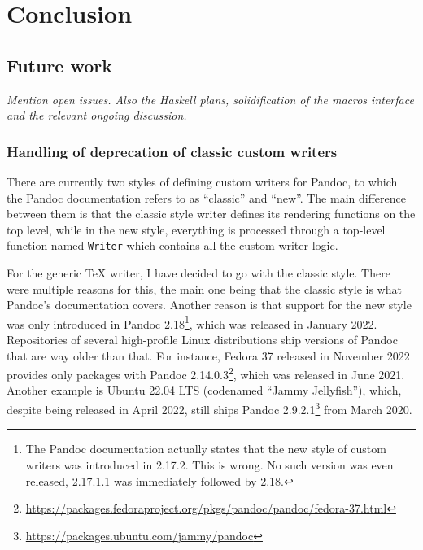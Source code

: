 \documentclass[
  digital,     %
  oneside,     %
  nosansbold,  %
  nocolorbold, %
  lof,         %
  nolot,       %
]{fithesis4}
\begin{document}
% 


\chapter{Conclusion}
\section{Future work}
\emph{Mention open issues. Also the Haskell plans, solidification of the macros interface and the relevant ongoing discussion.}

\subsection{Handling of deprecation of classic custom writers}

There are currently two styles of defining custom writers for Pandoc, to which the Pandoc documentation refers to as ``classic'' and ``new''. The main difference between them is that the classic style writer defines its rendering functions on the top level, while in the new style, everything is processed through a top-level function named \texttt{Writer} which contains all the custom writer logic.

For the generic \TeX{} writer, I have decided to go with the classic style. There were multiple reasons for this, the main one being that the classic style is what Pandoc's documentation covers. Another reason is that support for the new style was only introduced in Pandoc 2.18\footnote{The Pandoc documentation actually states that the new style of custom writers was introduced in 2.17.2. This is wrong. No such version was even released, 2.17.1.1 was immediately followed by 2.18.}, which was released in January 2022. Repositories of several high-profile Linux distributions ship versions of Pandoc that are way older than that. For instance, Fedora 37 released in November 2022 provides only packages with Pandoc 2.14.0.3\footnote{\url{https://packages.fedoraproject.org/pkgs/pandoc/pandoc/fedora-37.html}}, which was released in June 2021. Another example is Ubuntu 22.04 LTS (codenamed ``Jammy Jellyfish''), which, despite being released in April 2022, still ships Pandoc 2.9.2.1\footnote{\url{https://packages.ubuntu.com/jammy/pandoc}} from March 2020.
\end{document}
